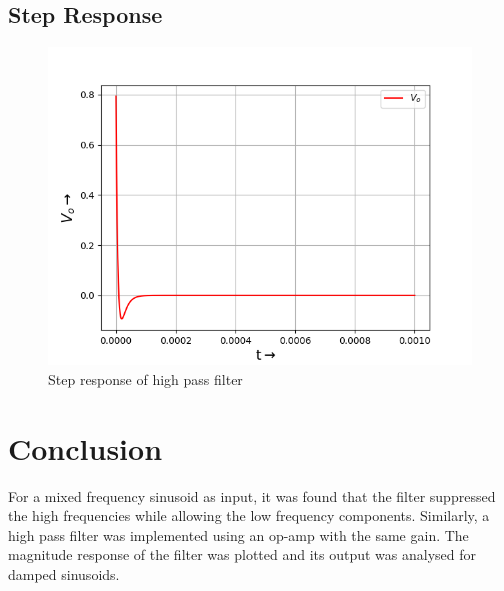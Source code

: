 \documentclass[11pt, a4paper]{article}
\begin{document}
   \subsection{Step Response}
   \begin{figure}[!tbh]
   	\centering
   	\includegraphics[scale=0.5]{fig5.png}  %
   	\caption{Step response of high pass filter}
   	\label{fig:sample}
   \end{figure}
   \newpage
 \section{Conclusion}
 For a mixed frequency sinusoid as
input, it was found that the filter suppressed the high frequencies while
allowing the low frequency components. Similarly, a high pass filter was
implemented using an op-amp with the same gain. The magnitude response
of the filter was plotted and its output was analysed for damped sinusoids.
\end{document}
